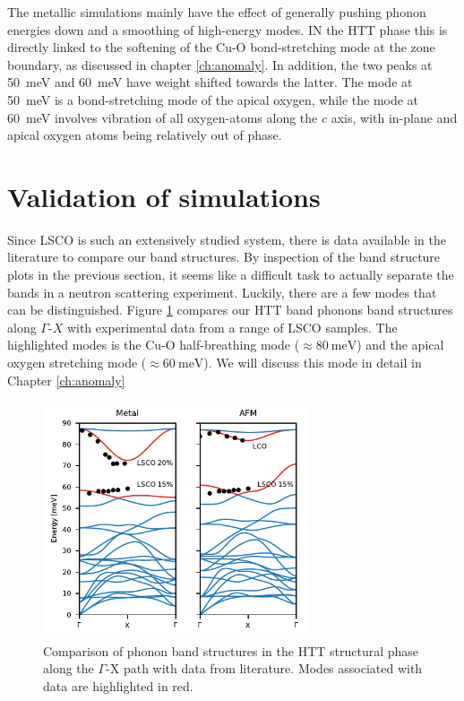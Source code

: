 The metallic simulations mainly have the effect of generally pushing phonon energies down and a smoothing of high-energy modes. IN the HTT phase this is directly linked to the softening of the Cu-O bond-stretching mode at the zone boundary, as discussed in chapter \ref{ch:anomaly}. In addition, the two peaks at \SI{50}{\milli\eV} and \SI{60}{\milli\eV} have weight shifted towards the latter. The mode at \SI{50}{\milli\eV} is a bond-stretching mode of the apical oxygen, while the mode at \SI{60}{\milli\eV} involves vibration of all oxygen-atoms along the $c$ axis, with in-plane and apical oxygen atoms being relatively out of phase.

\section{Validation of simulations}\label{sec:sim_validation}
Since LSCO is such an extensively studied system, there is data available in the literature to compare our band structures. By inspection of the band structure plots in the previous section, it seems like a difficult task to actually separate the bands in a neutron scattering experiment. Luckily, there are a few modes that can be distinguished. Figure \ref{fig:htt_phonons_lit} compares our HTT band phonons band structures along $\Gamma$-$X$ with experimental data from a range of LSCO samples. The highlighted modes is the Cu-O half-breathing mode ($\approx \SI{80}{\milli\eV}$) and the apical oxygen stretching mode ($\approx \SI{60}{\milli\eV}$). We will discuss this mode in detail in Chapter \ref{ch:anomaly}

\begin{figure}
	\centering
	\includegraphics[width=0.7\textwidth]{fig/simulation/htt_phonons_lit.pdf}
	\caption[phonon bands: comparison with literature]{Comparison of phonon band structures in the HTT structural phase along the $\Gamma$-X path with data from literature. Modes associated with data are highlighted in red.}
	\label{fig:htt_phonons_lit}
\end{figure}

